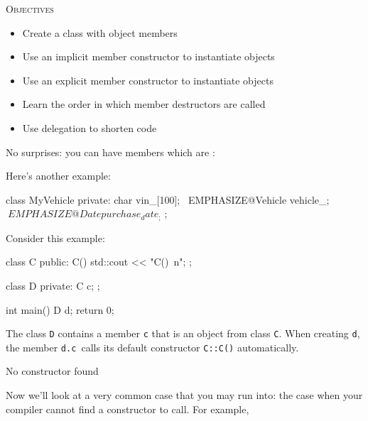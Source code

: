 \newpage{}

\textsc{Objectives}

\begin{itemize}
\item
  Create a class with object members
\item
  Use an implicit member constructor to instantiate objects
\item
  Use an explicit member constructor to instantiate objects
\item
  Learn the order in which member destructors are called
\item
  Use delegation to shorten code
\end{itemize}

\newpage{}

No surprises: you can have members which are :


Here's another example:

\begin{console}[commandchars=\~\@\$]
class MyVehicle
{     
private:
        char vin_[100];
        ~EMPHASIZE@Vehicle vehicle_;$
        ~EMPHASIZE@Date purchase_date_;$
};
\end{console}

\newpage{}

Consider this example:
\begin{console}
class C
{
public:
        C() { std::cout << "C()\ n"; }
};

class D
{
private:
        C c;
};

int main()
{   
    D d;
    return 0;
}
\end{console}

The class \texttt{D} contains a member \texttt{c} that is an object from
class \texttt{C}. When creating \texttt{d}, the member \texttt{d.c }calls its
default constructor \texttt{C::C()} automatically.

No constructor found

Now we'll look at a very common case that you may run
into: the case when your compiler cannot find a constructor to call. For
example,

